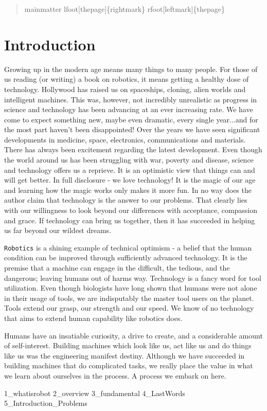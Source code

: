 \begin{quote}
mainmatter lfoot{[}thepage{]}\{rightmark\}
rfoot{[}leftmark{]}\{thepage\}
\end{quote}

\hypertarget{introduction}{%
\section{Introduction}\label{introduction}}

Growing up in the modern age means many things to many people. For those
of us reading (or writing) a book on robotics, it means getting a
healthy dose of technology. Hollywood has raised us on spaceships,
cloning, alien worlds and intelligent machines. This was, however, not
incredibly unrealistic as progress in science and technology has been
advancing at an ever increasing rate. We have come to expect something
new, maybe even dramatic, every single year...and for the most part
haven't been disappointed! Over the years we have seen significant
developments in medicine, space, electronics, communications and
materials. There has always been excitement regarding the latest
development. Even though the world around us has been struggling with
war, poverty and disease, science and technology offers us a reprieve.
It is an optimistic view that things can and will get better. In full
disclosure - we love technology! It is the magic of our age and learning
how the magic works only makes it more fun. In no way does the author
claim that technology is the answer to our problems. That clearly lies
with our willingness to look beyond our differences with acceptance,
compassion and grace. If technology can bring us together, then it has
succeeded in helping us far beyond our wildest dreams.

\texttt{Robotics} is a shining example of technical optimism - a belief
that the human condition can be improved through sufficiently advanced
technology. It is the premise that a machine can engage in the
difficult, the tedious, and the dangerous; leaving humans out of harms
way. Technology is a fancy word for tool utilization. Even though
biologists have long shown that humans were not alone in their usage of
tools, we are indisputably the master tool users on the planet. Tools
extend our grasp, our strength and our speed. We know of no technology
that aims to extend human capability like robotics does.

Humans have an insatiable curiosity, a drive to create, and a
considerable amount of self-interest. Building machines which look like
us, act like us and do things like us was the engineering manifest
destiny. Although we have succeeded in building machines that do
complicated tasks, we really place the value in what we learn about
ourselves in the process. A process we embark on here.

1\_whatisrobot 2\_overview 3\_fundamental 4\_LastWords
5\_Introduction\_Problems
